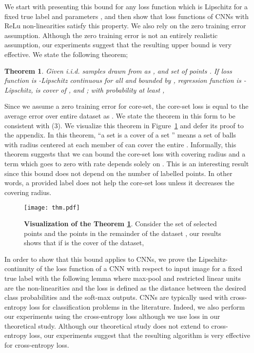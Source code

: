 \documentclass{article} \usepackage{iclr2018_conference,times}
\newtheorem{theorem}{Theorem}
\begin{document}
We start with presenting this bound for any loss function which is Lipschitz for a fixed true label  and parameters , and then show that loss functions of CNNs with ReLu non-linearities satisfy this property. We also rely on the zero training error assumption. Although the zero training error is not an entirely realistic assumption,  our experiments suggest that the resulting upper bound is very effective. We state the following theorem;
\begin{theorem} Given  i.i.d. samples drawn from  as , and set of
    points . If loss function  is -Lipschitz continuous
    for all  and bounded by , regression function is -Lipschitz, 
    is  cover of , and
    ; with probability at least ,

\label{mainthm2} \end{theorem}

Since we assume a zero training error for core-set, the core-set loss is equal to the average error over entire dataset as \mbox{}. We state the theorem in this form to be consistent with (3). We visualize this theorem in Figure~\ref{fig:thm} and defer its proof to the appendix. In this theorem, ``a set  is a  cover of a set ''  means a set of balls with radius
 centered at each member of  can cover the entire . Informally, this theorem suggests that we can bound the core-set loss with covering radius and a term which goes to
zero with rate depends solely on . This is an interesting result since this bound does not depend on the number of labelled points. In
other words, a provided label does not help the core-set loss unless it decreases the covering radius.

\begin{figure}[t]
\vspace{-5mm}
    \begin{center} \texttt{[image: thm.pdf]} \end{center} 
        \caption{\textbf{Visualization of the Theorem \ref{mainthm2}}. Consider the set of selected points
        {\color{myblue} } and the points in the remainder of the dataset {\color{myred} }, our results shows that if  is the  cover of the dataset, 
        }
    \label{fig:thm}
    \end{figure}

In order to show that this bound applies to CNNs, we prove the Lipschitz-continuity of the loss function of a CNN with respect to input image for a fixed true label with the following lemma where max-pool and restricted linear units are the non-linearities and the loss is defined as the  distance between the desired class probabilities and the soft-max outputs. CNNs are typically used with cross-entropy loss for classification problems in the literature. Indeed, we also perform our experiments using the cross-entropy loss although we use  loss in our theoretical study. Although our theoretical study does not extend to cross-entropy loss, our experiments suggest that the resulting algorithm is very effective for cross-entropy loss.
\end{document}
